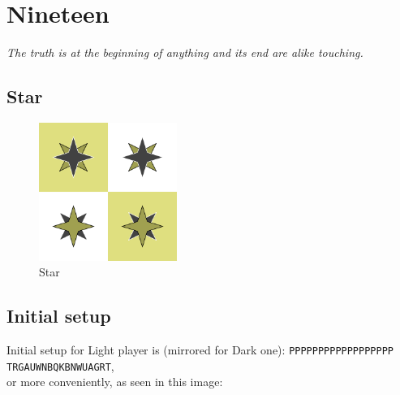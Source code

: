 \documentclass[a5paper,12pt,draft]{book} %
\begin{document}
\clearpage

\chapter*{Nineteen}

\begin{flushright}
\parbox{0.8\textwidth}{
\emph{The truth is at the beginning of anything and its end are alike touching. \\
 } }
\end{flushright}

\section*{Star}

\noindent
\begin{figure}
\includegraphics[width=0.4\textwidth, keepaspectratio=true]{../gfx/pieces/11_star.png}
\caption{Star}
\label{fig:star}
\end{figure}

\clearpage

\section*{Initial setup}

Initial setup for Light player is (mirrored for Dark one):
\texttt{PPPPPPPPPPPPPPPPPP \\
        TRGAUWNBQKBNWUAGRT}, \\
or more conveniently, as seen in this image:
\end{document}
